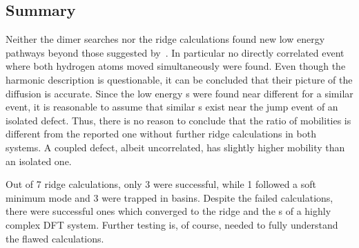\subsection{Summary}
Neither the dimer searches nor the ridge calculations found new low energy pathways beyond those suggested by~\cite{double-defect-2011}.
In particular no directly correlated event where both hydrogen atoms moved simultaneously were found.
Even though the harmonic description is questionable, it can be concluded that their picture of the diffusion is accurate.
Since the low energy s were found near different  for a similar event, it is reasonable to assume that similar s exist near the jump event of an isolated defect.
Thus, there is no reason to conclude that the ratio of mobilities is different from the reported one without further ridge calculations in both systems.
A coupled defect, albeit uncorrelated, has slightly higher mobility than an isolated one.

Out of 7 ridge calculations, only 3 were successful, while 1 followed a soft minimum mode and 3 were trapped in basins.
Despite the failed calculations, there were successful ones which converged to the ridge and the s of a highly complex DFT system.
Further testing is, of course, needed to fully understand the flawed calculations.
